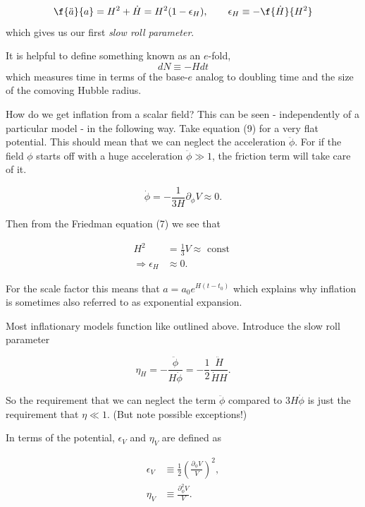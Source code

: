 \begin{equation}
    \f{\ddot{a}}{a}=H^2+ \dot{H}=H^2(1-\epsilon_H), \qquad \epsilon_H\equiv -\f{\dot{H}}{H^2}
\end{equation}
which gives us our first \textit{slow roll parameter}.

It is helpful to define something known as an $e$-fold,
\begin{equation}
    dN\equiv -Hdt
\end{equation}
which measures time in terms of the base-$e$ analog to doubling time and the size of the comoving Hubble radius. 

\[\]
How do we get inflation from a scalar field? This can be seen - independently of a particular model - in the following way. Take equation (9) for a very flat potential. This should mean that we can neglect the acceleration $\ddot{\phi}$. For if the field $\phi$ starts off with a huge acceleration $\ddot{\phi} \gg 1$, the friction term will take care of it.

$$
\dot{\phi}=-\frac{1}{3 H} \partial_\phi V \approx 0 .
$$


Then from the Friedman equation (7) we see that

$$
\begin{aligned}
H^2 & =\frac{1}{3} V \approx \text { const } \\
\Rightarrow \epsilon_H & \approx 0 .
\end{aligned}
$$


For the scale factor this means that $a=a_0 e^{H\left(t-t_0\right)}$ which explains why inflation is sometimes also referred to as exponential expansion.

Most inflationary models function like outlined above. Introduce the slow roll parameter

$$
\eta_H=-\frac{\ddot{\phi}}{H \dot{\phi}}=-\frac{1}{2} \frac{\ddot{H}}{\dot{H} H} .
$$


So the requirement that we can neglect the term $\ddot{\phi}$ compared to $3 H \dot{\phi}$ is just the requirement that $\eta \ll 1$. (But note possible exceptions!)

In terms of the potential, $\epsilon_V$ and $\eta_V$ are defined as

$$
\begin{aligned}
\epsilon_V & \equiv \frac{1}{2}\left(\frac{\partial_\phi V}{V}\right)^2, \\
\eta_V & \equiv \frac{\partial_\phi^2 V}{V} .
\end{aligned}
$$


